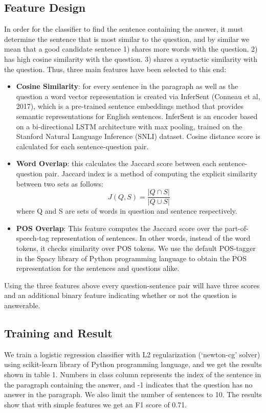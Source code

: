 \subsection{Feature Design} 
In order for the classifier to find the sentence containing the answer, it must determine the sentence that is most similar to the question, and by similar we mean that a good candidate sentence  1) shares more words with the question. 2) has high cosine similarity with the question. 3) shares a syntactic similarity with the question. Thus, three main features have been selected to this end:
\begin{itemize}
\item \textbf{Cosine Similarity}: for every sentence in the paragraph as well as the question a word vector representation is created via InferSent (Conneau et al, 2017), which is a pre-trained sentence embeddings method that provides semantic representations for English sentences. InferSent is an encoder based on a bi-directional LSTM architecture with max pooling, trained on the Stanford Natural Language Inference (SNLI) dataset. Cosine distance score is calculated for each sentence-question pair. 
\item \textbf{Word Overlap}: this calculates the Jaccard score between each sentence-question pair. Jaccard index is a method of computing the explicit similarity between two sets as follows: 
$$
J(Q,S) = \frac{|Q \cap S|}{|Q \cup S|}
$$
where Q and S are sets of words in question and sentence respectively.

\item \textbf{POS Overlap}: This feature computes the Jaccard score over the part-of-speech-tag representation of sentences. In other words, instead of the word tokens, it checks similarity over POS tokens. We use the default POS-tagger in the Spacy library of Python programming language to obtain the POS representation for the sentences and questions alike.
\end{itemize}
Using the three features above every question-sentence pair will have three scores and an additional binary feature indicating whether or not the question is answerable. 

\subsection{Training and Result} 
We train a logistic regression classifier with L2 regularization (`newton-cg' solver) using scikit-learn library of Python programming language, and we get the results shown in table 1. Numbers in class column represents the index of the sentence in the paragraph containing the answer, and -1 indicates that the question has no answer in the paragraph. We also limit the number of sentences to 10. The results show that with simple features we get an F1 score of 0.71.

